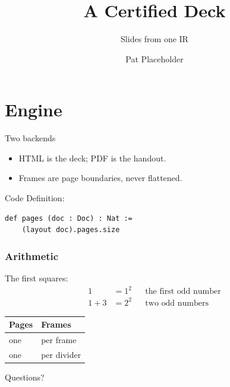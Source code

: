\documentclass[aspectratio=169]{beamer}
\title{A Certified Deck}
\subtitle{Slides from one IR}
\author{Pat Placeholder}
\institute{example.org}
\date{}
\newcommand{\dim}[1]{\textcolor{quiet!50}{#1}}
\newenvironment{banner}[1]{}{}
\begin{document}
\maketitle

\section{Engine}

\begin{frame}{Two backends}
    \begin{itemize}
        \item<1-> HTML is the deck; PDF is the handout.
        \item<2-> \alert{Frames are page boundaries}, never flattened.
    \end{itemize}
\end{frame}

\begin{banner}{decoration}
    \begin{frame}[fragile]{Code}
        Definition:
\begin{verbatim}
def pages (doc : Doc) : Nat :=
    (layout doc).pages.size
\end{verbatim}
        \uncover<2>{\dim{Checked at build time.}}
    \end{frame}
\end{banner}

\begin{frame}
    \frametitle{Arithmetic}
    The first squares:
    \begin{align*}
        1 &= 1^2 && \text{the first odd number}
        \\1 + 3 &= 2^2 && \text{two odd numbers}
    \end{align*}

    \begin{tabular}{ll}
        \textbf{Pages} & \textbf{Frames} \\
        \midrule
        one & per frame \\
        one & per divider \\
    \end{tabular}
\end{frame}

\begin{frame}[standout]
    Questions?
\end{frame}
\end{document}

